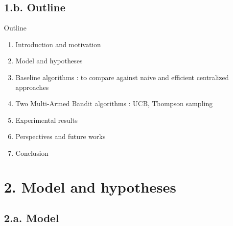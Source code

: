 \documentclass[12pt,english,ignorenonframetext,]{beamer}
\providecommand{\tightlist}{%
  \setlength{\itemsep}{0pt}\setlength{\parskip}{0pt}}
\begin{document}
\subsection{\hfill{}1.b. Outline\hfill{}}

\begin{frame}{Outline}

\begin{enumerate}
\def\labelenumi{\arabic{enumi}.}
\tightlist
\item
  Introduction and motivation
\item
  Model and hypotheses
\item
  Baseline algorithms : to compare against naive and efficient
  centralized approaches
\item
  Two Multi-Armed Bandit algorithms : UCB, Thompson sampling
\item
  Experimental results
\item
  Perspectives and future works
\item
  Conclusion
\end{enumerate}

\end{frame}



\section{\hfill{}2. Model and hypotheses\hfill{}}

\subsection{\hfill{}2.a. Model\hfill{}}
\end{document}
